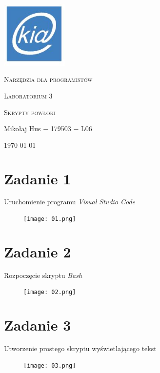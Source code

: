 \documentclass[fleqn,onecolumn,a4paper,12pt,titlepage]{article}
\begin{document}
\begin{titlepage}
    \includegraphics[width=0.25\textwidth]{logo_kia.png}\par\vspace{3cm}
    \centering
    {\LARGE \textsc{Narzędzia dla programistów} \par}
    \vspace{2cm}
    {\Large \textsc{Laboratorium 3} \par} %
    \vspace{2cm}
    {\textsc{Skrypty powłoki} \par} %
    \vfill
    Mikołaj Hus $-$ 179503 $-$ L06 \par %
    \vspace{2cm}
    {\large {\today} \par}
\end{titlepage}

\section*{Zadanie 1}

Uruchomienie programu \textit{Visual Studio Code}
\begin{figure}[H]%
    \centering\texttt{[image: 01.png]}
\end{figure}

\section*{Zadanie 2}

Rozpoczęcie skryptu \textit{Bash}
\begin{figure}[H]%
    \centering\texttt{[image: 02.png]}
\end{figure}

\section*{Zadanie 3}

Utworzenie prostego skryptu wyświetlającego tekst
\begin{figure}[H]%
    \centering\texttt{[image: 03.png]}
\end{figure}
\end{document}
